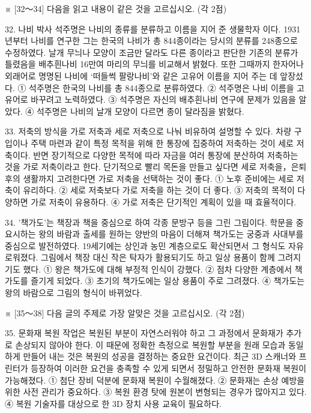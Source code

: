 \documentclass[12pt]{article}
\begin{document}
\begin{enumerate}[1.]
※ [32～34] 다음을 읽고 내용이 같은 것을 고르십시오. (각 2점)

32.
  나비 박사 석주명은 나비의 종류를 분류하고 이름을 지어 준 생물학자
이다. 1931년부터 나비를 연구한 그는 한국의 나비가 총 844종이라는 당시의
분류를 248종으로 수정하였다. 날개 무늬나 모양이 조금만 달라도 다른
종이라고 판단한 기존의 분류가 틀렸음을 배추흰나비 16만여 마리의 무늬를
비교해서 밝혔다. 또한 그때까지 한자어나 외래어로 명명된 나비에 ‘떠들썩
팔랑나비’와 같은 고유어 이름을 지어 주는 데 앞장섰다.
① 석주명은 한국의 나비를 총 844종으로 분류하였다.
② 석주명은 나비 이름을 고유어로 바꾸려고 노력하였다.
③ 석주명은 자신의 배추흰나비 연구에 문제가 있음을 알았다.
④ 석주명은 나비의 날개 모양이 다르면 종이 달라짐을 밝혔다.


33.
  저축의 방식을 가로 저축과 세로 저축으로 나눠 비유하여 설명할 수
있다. 차량 구입이나 주택 마련과 같이 특정 목적을 위해 한 통장에 집중하여
저축하는 것이 세로 저축이다. 반면 장기적으로 다양한 목적에 따라 자금을
여러 통장에 분산하여 저축하는 것을 가로 저축이라고 한다. 단기적으로
빨리 목돈을 만들고 싶다면 세로 저축을，은퇴 후의 생활까지 고려한다면
가로 저축을 선택하는 것이 좋다.
① 노후 준비에는 세로 저축이 유리하다.
② 세로 저축보다 가로 저축을 하는 것이 더 좋다.
③ 저축의 목적이 다양하면 가로 저축이 유용하다.
④ 가로 저축은 단기적인 계획이 있을 때 효율적이다.


34.
  '책가도’는 책장과 책을 중심으로 하여 각종 문방구 등을 그린 그림이다.
학문을 중요시하는 왕의 바람과 출세를 원하는 양반의 마음이 더해져
책가도는 궁중과 사대부를 중심으로 발전하였다. 19세기에는 상인과 농민
계층으로도 확산되면서 그 형식도 자유로워졌다. 그림에서 책장 대신 작은
탁자가 활용되기도 하고 일상 용품이 함께 그려지기도 했다.
① 왕은 책가도에 대해 부정적 인식이 강했다.
② 점차 다양한 계층에서 책가도를 즐기게 되었다.
③ 초기의 책가도에는 일상 용품이 주로 그려졌다.
④ 책가도는 왕의 바람으로 그림의 형식이 바뀌었다.




※ [35～38] 다음 글의 주제로 가장 알맞은 것을 고르십시오. (각 2점)

35.
  문화재 복원 작업은 복원된 부분이 자연스러워야 하고 그 과정에서
문화재가 추가로 손상되지 않아야 한다. 이 때문에 정확한 측정으로 복원할
부분을 원래 모습과 동일하게 만들어 내는 것은 복원의 성공을 결정하는
중요한 요건이다. 최근 3D 스캐너와 프린터가 등장하여 이러한 요건을
충족할 수 있게 되면서 정밀하고 안전한 문화재 복원이 가능해졌다.
① 첨단 장비 덕분에 문화재 복원이 수월해졌다.
② 문화재는 손상 예방을 위한 사전 관리가 중요하다.
③ 복원 환경 탓에 원본이 변형되는 경우가 많아지고 있다.
④ 복원 기술자를 대상으로 한 3D 장치 사용 교육이 필요하다.



\end{enumerate}
\end{document}
